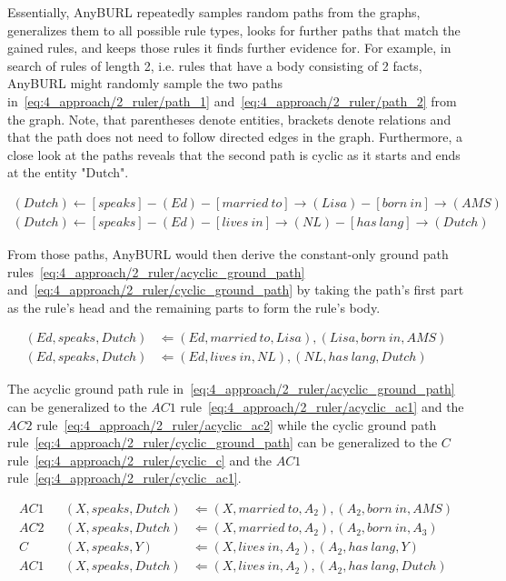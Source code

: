 Essentially, AnyBURL repeatedly samples random paths from the graphs, generalizes them to all possible rule types, looks for further paths that match the gained rules, and keeps those rules it finds further evidence for. For example, in search of rules of length 2, i.e. rules that have a body consisting of 2 facts, AnyBURL might randomly sample the two paths in~\ref{eq:4_approach/2_ruler/path_1} and~\ref{eq:4_approach/2_ruler/path_2} from the graph. Note, that parentheses denote entities, brackets denote relations and that the path does not need to follow directed edges in the graph. Furthermore, a close look at the paths reveals that the second path is cyclic as it starts and ends at the entity "Dutch".

\begin{align}
(Dutch)
    \leftarrow [speaks] - (Ed) - [married~to] \rightarrow (Lisa) - [born~in] \rightarrow (AMS)
    \label{eq:4_approach/2_ruler/path_1} \\
    (Dutch) \leftarrow [speaks] - (Ed) - [lives~in] \rightarrow (NL) - [has~lang] \rightarrow (Dutch)
    \label{eq:4_approach/2_ruler/path_2}
\end{align}

From those paths, AnyBURL would then derive the constant-only
ground path rules~\ref{eq:4_approach/2_ruler/acyclic_ground_path} and~\ref{eq:4_approach/2_ruler/cyclic_ground_path} by taking the path's first part as the rule's head and the remaining parts to form the rule's body.

\begin{align}
(Ed, speaks, Dutch)
    &\Leftarrow (Ed, married~to, Lisa), (Lisa, born~in, AMS)
    \label{eq:4_approach/2_ruler/acyclic_ground_path} \\
    (Ed, speaks, Dutch) &\Leftarrow (Ed, lives~in, NL), (NL, has~lang, Dutch)
    \label{eq:4_approach/2_ruler/cyclic_ground_path}
\end{align}

The acyclic ground path rule in~\ref{eq:4_approach/2_ruler/acyclic_ground_path} can be generalized to the $AC1$ rule~\ref{eq:4_approach/2_ruler/acyclic_ac1} and the $AC2$ rule~\ref{eq:4_approach/2_ruler/acyclic_ac2} while the cyclic ground path rule~\ref{eq:4_approach/2_ruler/cyclic_ground_path} can be generalized to the $C$ rule~\ref{eq:4_approach/2_ruler/cyclic_c} and the $AC1$ rule~\ref{eq:4_approach/2_ruler/cyclic_ac1}.

\begin{align}
    AC1 && (X, speaks, Dutch) &\Leftarrow (X, married~to, A_2), (A_2, born~in, AMS)
    \label{eq:4_approach/2_ruler/acyclic_ac1} \\
    AC2 && (X, speaks, Dutch) &\Leftarrow (X, married~to, A_2), (A_2, born~in, A_3)
    \label{eq:4_approach/2_ruler/acyclic_ac2} \\
        C   && (X, speaks, Y) &\Leftarrow (X, lives~in, A_2), (A_2, has~lang, Y)
    \label{eq:4_approach/2_ruler/cyclic_c} \\
    AC1 && (X, speaks, Dutch) &\Leftarrow (X, lives~in, A_2), (A_2, has~lang, Dutch)
    \label{eq:4_approach/2_ruler/cyclic_ac1}
\end{align}

